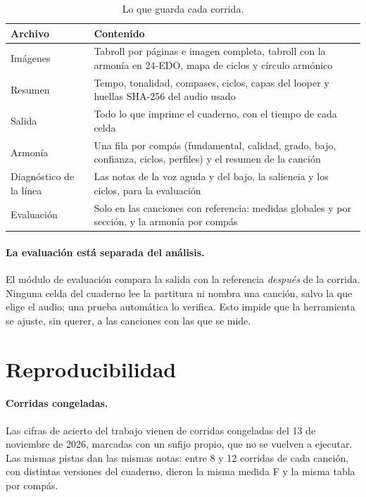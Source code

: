 \begin{table}[ht]
  \centering\small
  \caption{Lo que guarda cada corrida.}\label{tab:salidas}
  \begin{tabularx}{\textwidth}{@{}l>{\raggedright\arraybackslash}X@{}}
    \toprule
    Archivo & Contenido \\
    \midrule
    Imágenes & Tabroll por páginas e imagen completa, tabroll con la armonía en 24-EDO, mapa de ciclos y círculo armónico \\
    Resumen & Tempo, tonalidad, compases, ciclos, capas del looper y huellas SHA-256 del audio usado \\
    Salida & Todo lo que imprime el cuaderno, con el tiempo de cada celda \\
    Armonía & Una fila por compás (fundamental, calidad, grado, bajo, confianza, ciclos, perfiles) y el resumen de la canción \\
    Diagnóstico de la línea & Las notas de la voz aguda y del bajo, la saliencia y los ciclos, para la evaluación \\
    Evaluación & Solo en las canciones con referencia: medidas globales y por sección, y la armonía por compás \\
    \bottomrule
  \end{tabularx}
\end{table}

\paragraph{La evaluación está separada del análisis.} El módulo de evaluación compara la salida con la referencia
\emph{después} de la corrida. Ninguna celda del cuaderno lee la partitura ni nombra una canción, salvo la que elige el
audio; una prueba automática lo verifica. Esto impide que la herramienta se ajuste, sin querer, a las canciones con las que
se mide.

\section{Reproducibilidad}

\paragraph{Corridas congeladas.} Las cifras de acierto del trabajo vienen de corridas congeladas del 13 de noviembre de
2026, marcadas con un sufijo propio, que no se vuelven a ejecutar. Las mismas pistas dan las mismas notas: entre 8 y 12
corridas de cada canción, con distintas versiones del cuaderno, dieron la misma medida F y la misma tabla por compás.

